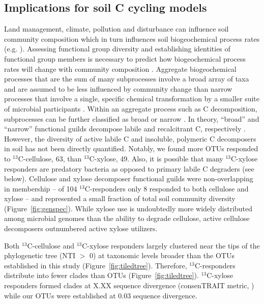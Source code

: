 \subsection{Implications for soil C cycling models}
Land management, climate, pollution and disturbance can influence soil
community composition \citep{McGuire2010} which in turn influences soil
biogeochemical process rates (e.g. \citep{Berlemont2014a}). Assessing
functional group diversity and establishing identities of functional group
members is necessary to predict how biogeochemical process rates will change
with community composition \citep{Schimel_1995,McGuire2010}. Aggregate
biogeochemical processes that are the sum of many subprocesses involve a broad
array of taxa and are assumed to be less influenced by community change than
narrow processes that involve a single, specific chemical transformation by
a smaller suite of microbial participants \citep{Schimel_1995,McGuire2010}.
Within an aggregate process such as C decomposition, subprocesses can be
further classified as broad or narrow \citep{McGuire2010}. In theory,
``broad'' and ``narrow'' functional guilds decompose labile and
recalcitrant C, respectively \citep{McGuire2010}. However, the diversity
of active labile C and insoluble, polymeric C decomposers in soil has not
been directly quantified. Notably, we found more OTUs responded to
$^{13}$C-cellulose, 63, than $^{13}$C-xylose, 49. Also, it is possible
that many $^{13}$C-xylose responders are predatory bacteria as opposed to
primary labile C degraders (see below). Cellulose and xylose decomposer
functional guilds were non-overlapping in membership -- of
104 $^{13}$C-responders only 8 responded to both cellulose and xylose -- and
represented a small fraction of total soil community diversity
(Figure~\ref{fig:genspec}). While xylose use is undoubtedly more widely
distributed among microbial genomes than the ability to degrade cellulose,
active cellulose decomposers outnumbered active xylose utilizers.

Both $^{13}$C-cellulose and $^{13}$C-xylose responders largely clustered
near the tips of the phylogenetic tree (NTI $>$ 0) at taxonomic levels broader
than the OTUs established in this study (Figure~\ref{fig:tiledtree}).
Therefore, $^{13}$C-responders distribute into fewer clades than OTUs
(Figure~\ref{fig:tiledtree}). $^{13}$C-xylose responders formed clades at X.XX
sequence divergence (consenTRAIT metric, \citep{Martiny2013}) while our OTUs
were established at
0.03 sequence divergence. 

